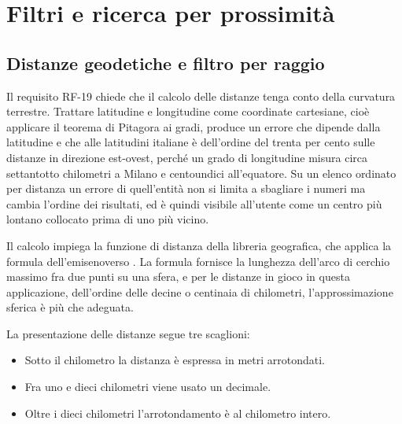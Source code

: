 
\section{Filtri e ricerca per prossimità}\label{sec:impl-filtri}

\subsection{Distanze geodetiche e filtro per raggio}\label{subsec:impl-filtraggio}

Il requisito RF-19 chiede che il calcolo delle distanze tenga conto della curvatura terrestre. %
Trattare latitudine e longitudine come coordinate cartesiane, cioè applicare il teorema di Pitagora ai gradi, produce un errore che
dipende dalla latitudine e che alle latitudini italiane è dell'ordine del trenta per cento sulle distanze in direzione est-ovest,
perché un grado di longitudine misura circa settantotto chilometri a Milano e centoundici all'equatore.
Su un elenco ordinato per distanza un errore di quell'entità non si limita a sbagliare i numeri ma cambia l'ordine dei risultati,
ed è quindi visibile all'utente come un centro più lontano collocato prima di uno più vicino.

Il calcolo impiega la funzione di distanza della libreria geografica, che applica la formula dell'emisenoverso \cite{sinnottHaversine}.
La formula fornisce la lunghezza dell'arco di cerchio massimo fra due punti su una sfera, e per le distanze in gioco in questa applicazione,
dell'ordine delle decine o centinaia di chilometri, l'approssimazione sferica è più che adeguata.%

La presentazione delle distanze segue tre scaglioni:%

\begin{itemize}
  \item Sotto il chilometro la distanza è espressa in metri arrotondati.
  \item Fra uno e dieci chilometri viene usato un decimale.
  \item Oltre i dieci chilometri l'arrotondamento è al chilometro intero.%
\end{itemize}

